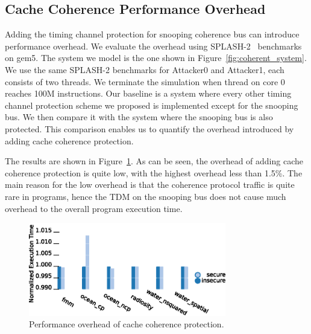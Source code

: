 \subsection{Cache Coherence Performance Overhead}

Adding the timing channel protection for snooping coherence bus can introduce 
performance overhead. We evaluate the overhead using SPLASH-2~\cite{splash2} benchmarks on 
gem5. The system we model is the one shown in Figure~\ref{fig:coherent_system}.
We use the same SPLASH-2 benchmarks for Attacker0 and Attacker1, each consists 
of two threads. We terminate the simulation
when thread on core 0 reaches 100M instructions.  Our baseline is a system 
where every other timing channel protection scheme we proposed is implemented 
except for the snooping bus.
We then compare it with the system where the snooping bus is also protected. 
This comparison enables us to quantify the overhead introduced by adding 
cache coherence protection. 

The results are shown in Figure~\ref{fig:splash2}. As can be seen, the overhead 
of adding cache coherence protection is
quite low, with the highest overhead less than 1.5\%. 
The main reason for the low overhead is that the coherence protocol traffic 
is quite rare in programs, hence the TDM on the
snooping bus does not cause much overhead to the overall program execution 
time.

\begin{figure}
    \begin{center}
        \includegraphics[width=3.4in]{figs/SPLASH.eps}
        \caption{Performance overhead of cache coherence protection.}
        \label{fig:splash2}
		\vspace{-0.2in}
    \end{center}
\end{figure}
